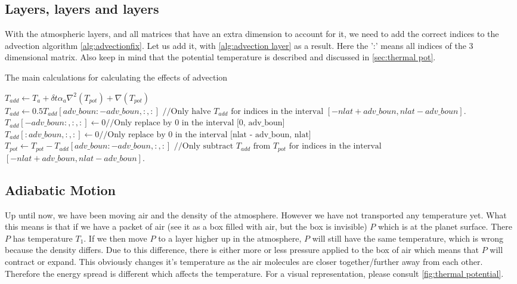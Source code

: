 \subsection{Layers, layers and layers}
With the atmospheric layers, and all matrices that have an extra dimension to account for it, we need to add the correct indices to the advection algorithm \autoref{alg:advectionfix}. Let us 
add it, with \autoref{alg:advection layer} as a result. Here the ':' means all indices of the 3 dimensional matrix. Also keep in mind that the potential temperature is described and discussed in 
\autoref{sec:thermal pot}. 

\begin{algorithm}
    \caption{The main calculations for calculating the effects of advection}
    \label{alg:advection layer}
    $T_{add} \leftarrow T_a + \delta t \alpha_a \nabla^2(T_{pot}) + \nabla(T_{pot})$ \;
    $T_{add} \leftarrow 0.5T_{add}[adv\_boun:-adv\_boun, :, :] \text{ //Only halve } T_{add} \text{ for indices in the interval } [-nlat + adv\_boun, nlat - adv\_boun]$. \;
    $T_{add}[-adv\_boun:, :, :] \leftarrow 0 \text{//Only replace by 0 in the interval [0, adv\_boun]}$ \;
    $T_{add}[:adv\_boun, :, :] \leftarrow 0 \text{//Only replace by 0 in the interval [nlat - adv\_boun, nlat]}$ \;
    $T_{pot} \leftarrow T_{pot} - T_{add}[adv\_boun:-adv\_boun, :, :] \text{ //Only subtract } T_{add} \text{ from } T_{pot} \text{ for indices in the interval }$
        $[-nlat + adv\_boun, nlat - adv\_boun]$. \;
\end{algorithm}

\subsection{Adiabatic Motion} \label{sec:thermal pot}
Up until now, we have been moving air and the density of the atmosphere. However we have not transported any temperature yet. What this means is that if we have a packet of air (see it as a box
filled with air, but the box is invisible) $P$ which is at the planet surface. There $P$ has temperature $T_1$. If we then move $P$ to a layer higher up in the atmosphere, $P$ will still have 
the same temperature, which is wrong because the density differs. Due to this difference, there is either more or less pressure applied to the box of air which means that $P$ will contract or 
expand. This obviously changes it's temperature as the air molecules are closer together/further away from each other. Therefore the energy spread is different which affects the temperature. 
For a visual representation, please consult \autoref{fig:thermal potential}.

